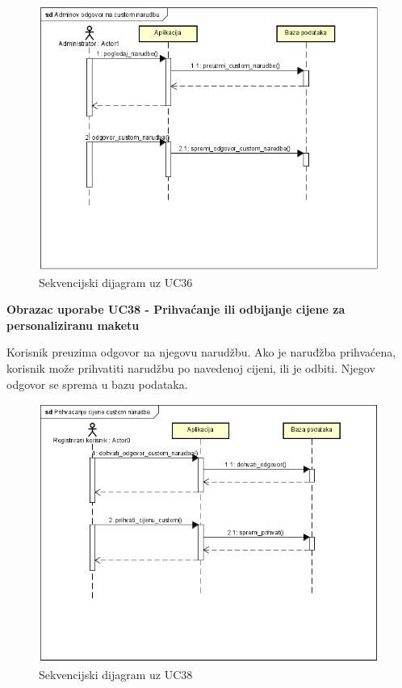 				\begin{figure} [!h]
					\centering
					\includegraphics[scale=0.65]{"slike/seqdiag_02"}
					\caption{Sekvencijski dijagram uz UC36}
					\label{fig:seqdiag_02}
				\end{figure}
				\pagebreak
				
				\textbf{Obrazac uporabe UC38 - Prihvaćanje ili odbijanje cijene za personaliziranu maketu}
				
				Korisnik preuzima odgovor na njegovu narudžbu. Ako je naruđžba prihvaćena, korisnik može prihvatiti narudžbu po navedenoj cijeni, ili je odbiti. Njegov odgovor se sprema u bazu podataka.
				
				\begin{figure} [!h]
					\centering
					\includegraphics[scale=0.65]{"slike/seqdiag_03"}
					\caption{Sekvencijski dijagram uz UC38}
					\label{fig:seqdiag_03}
				\end{figure}
				\pagebreak
				
